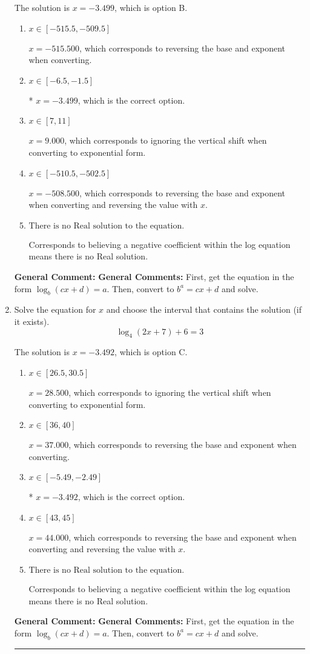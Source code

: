 \documentclass{extbook}[14pt]
\newcommand{\litem}[1]{\item #1

\rule{\textwidth}{0.4pt}}
\begin{document}
\begin{enumerate}
{The solution is \( x = -3.499 \), which is option B.\begin{enumerate}[label=\Alph*.]
\item \( x \in [-515.5, -509.5] \)

$x = -515.500$, which corresponds to reversing the base and exponent when converting.
\item \( x \in [-6.5, -1.5] \)

* $x = -3.499$, which is the correct option.
\item \( x \in [7, 11] \)

$x = 9.000$, which corresponds to ignoring the vertical shift when converting to exponential form.
\item \( x \in [-510.5, -502.5] \)

$x = -508.500$, which corresponds to reversing the base and exponent when converting and reversing the value with $x$.
\item \( \text{There is no Real solution to the equation.} \)

Corresponds to believing a negative coefficient within the log equation means there is no Real solution.
\end{enumerate}

\textbf{General Comment:} \textbf{General Comments:} First, get the equation in the form $\log_b{(cx+d)} = a$. Then, convert to $b^a = cx+d$ and solve.
}
\litem{
Solve the equation for $x$ and choose the interval that contains the solution (if it exists).
\[ \log_{4}{(2x+7)}+6 = 3 \]

The solution is \( x = -3.492 \), which is option C.\begin{enumerate}[label=\Alph*.]
\item \( x \in [26.5, 30.5] \)

$x = 28.500$, which corresponds to ignoring the vertical shift when converting to exponential form.
\item \( x \in [36, 40] \)

$x = 37.000$, which corresponds to reversing the base and exponent when converting.
\item \( x \in [-5.49, -2.49] \)

* $x = -3.492$, which is the correct option.
\item \( x \in [43, 45] \)

$x = 44.000$, which corresponds to reversing the base and exponent when converting and reversing the value with $x$.
\item \( \text{There is no Real solution to the equation.} \)

Corresponds to believing a negative coefficient within the log equation means there is no Real solution.
\end{enumerate}

\textbf{General Comment:} \textbf{General Comments:} First, get the equation in the form $\log_b{(cx+d)} = a$. Then, convert to $b^a = cx+d$ and solve.
}
\end{enumerate}
\end{document}
